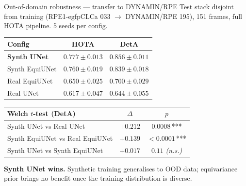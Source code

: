 \documentclass[10pt,aspectratio=169]{beamer}
\newcommand{\hilite}[1]{\textbf{\color{blue!60!black}#1}}
\begin{document}
\begin{frame}{Out-of-domain robustness --- transfer to DYNAMIN/RPE}
  \small
  Test stack disjoint from training (RPE1-egfpCLCa 033 $\rightarrow$ DYNAMIN/RPE 195), 151 frames, full HOTA pipeline. 5 seeds per config.
  \normalsize

  \vspace{3mm}
  \centering
  \footnotesize
  \begin{tabular}{l c c}
    \toprule
    Config            & HOTA                       & DetA                       \\
    \midrule
    \hilite{Synth UNet}     & \hilite{$0.777 \pm 0.013$} & \hilite{$0.856 \pm 0.011$} \\
    Synth EquiUNet          & $0.760 \pm 0.019$          & $0.839 \pm 0.018$          \\
    Real EquiUNet           & $0.650 \pm 0.025$          & $0.700 \pm 0.029$          \\
    Real UNet               & $0.617 \pm 0.047$          & $0.644 \pm 0.055$          \\
    \bottomrule
  \end{tabular}

  \vspace{4mm}
  \centering
  \footnotesize
  \begin{tabular}{l c c}
    \toprule
    Welch $t$-test (DetA)                  & $\Delta$    & $p$               \\
    \midrule
    Synth UNet \;\;vs\;\; Real UNet        & $+0.212$    & $0.0008$\,***     \\
    Synth EquiUNet vs Real EquiUNet        & $+0.139$    & $<\!0.0001$\,***  \\
    Synth UNet \;\;vs\;\; Synth EquiUNet   & $+0.017$    & $0.11$ \textit{(n.s.)} \\
    \bottomrule
  \end{tabular}
  \normalsize

  \vspace{3mm}
  \small \hilite{Synth UNet wins.} Synthetic training generalises to OOD data;
  equivariance prior brings no benefit once the training distribution is diverse.
\end{frame}
\end{document}
